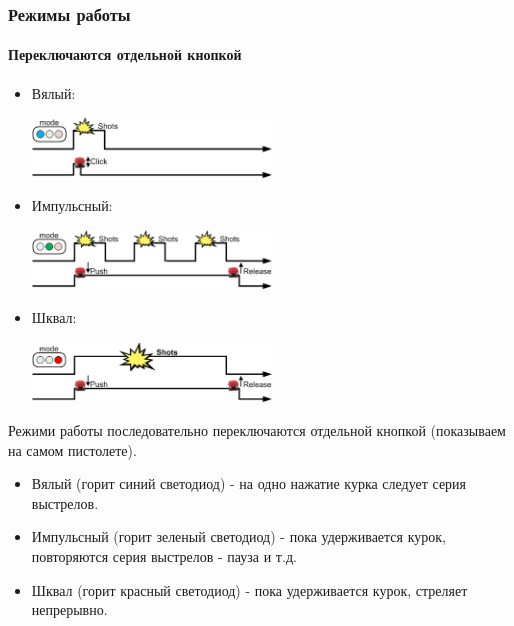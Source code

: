 \begin{frame}
    \frametitle{Режимы работы \myDevice}
    \framesubtitle{Переключаются отдельной кнопкой}
    
    \begin{itemize}
        \item Вялый:
            \begin{center}
                \includegraphics[width=0.5\textwidth]{fig/modeSlow}
            \end{center}
            
        \item Импульсный:
            \begin{center}
                \includegraphics[width=0.5\textwidth]{fig/modePulse}
            \end{center}
            
        \item Шквал:
            \begin{center}
                \includegraphics[width=0.5\textwidth]{fig/modeStorm}
            \end{center}
    \end{itemize}    
\end{frame}

Режими работы последовательно переключаются отдельной кнопкой (показываем на самом пистолете). 

\begin{itemize}
    \item Вялый (горит синий светодиод) - на одно нажатие курка следует серия выстрелов.
    \item Импульсный (горит зеленый светодиод) - пока удерживается курок, {\myDevice} повторяются серия выстрелов - пауза и т.д.
    \item Шквал (горит красный светодиод) - пока удерживается курок, {\myDevice} стреляет непрерывно.
\end{itemize}    


